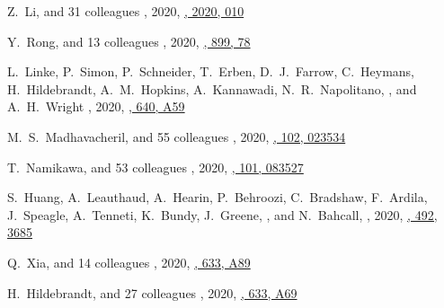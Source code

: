 \begin{etaremune}
\item
Z.~Li, and 31 colleagues
,
2020, \href{https://ui.adsabs.harvard.edu/abs/2020JCAP...09..010L}{\jcap, 2020, 010}

\item
Y.~Rong, and 13 colleagues
,
2020, \href{https://ui.adsabs.harvard.edu/abs/2020ApJ...899...78R}{\apj, 899, 78}

\item
L.~Linke, P.~Simon, P.~Schneider, T.~Erben, D.~J.~Farrow, C.~Heymans, H.~Hildebrandt, A.~M.~Hopkins, A.~Kannawadi, N.~R.~Napolitano, \myself, and A.~H.~Wright
,
2020, \href{https://ui.adsabs.harvard.edu/abs/2020A&A...640A..59L}{\aap, 640, A59}

\item
M.~S.~Madhavacheril, and 55 colleagues
,
2020, \href{https://ui.adsabs.harvard.edu/abs/2020PhRvD.102b3534M}{\prd, 102, 023534}

\item
T.~Namikawa, and 53 colleagues
,
2020, \href{https://ui.adsabs.harvard.edu/abs/2020PhRvD.101h3527N}{\prd, 101, 083527}

\item
S.~Huang, A.~Leauthaud, A.~Hearin, P.~Behroozi, C.~Bradshaw, F.~Ardila, J.~Speagle, A.~Tenneti, K.~Bundy, J.~Greene, \myself, and N.~Bahcall,
,
2020, \href{https://ui.adsabs.harvard.edu/abs/2020MNRAS.492.3685H}{\mnras, 492, 3685}

\item
Q.~Xia, and 14 colleagues
,
2020, \href{https://ui.adsabs.harvard.edu/abs/2020A&A...633A..89X}{\aap, 633, A89}

\item
H.~Hildebrandt, and 27 colleagues
,
2020, \href{https://ui.adsabs.harvard.edu/abs/2020A&A...633A..69H}{\aap, 633, A69}


\end{etaremune}

